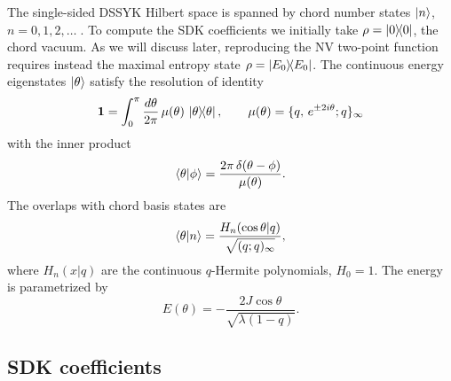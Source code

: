 \documentclass[12pt]{scrarticle}
\begin{document}
The single-sided DSSYK Hilbert space is spanned by chord number states $\ket{n}$,
$n = 0,1,2,\ldots\;$. To compute the SDK coefficients we initially take
$\rho = \ketbra{0}{0}$, the chord vacuum. As we will discuss later,
reproducing the NV two-point function requires instead the maximal entropy state
$\rho = \ketbra{E_0}{E_0}$.
The continuous energy eigenstates $\ket{\theta}$ satisfy the resolution of identity
\begin{equation}
    \mathbf{1} = \int_0^\pi \frac{d\theta}{2\pi}\,\mu(\theta)\,\ketbra{\theta}{\theta},
    \qquad
    \mu(\theta) = \{ q,\,e^{\pm 2i\theta}; q\}_\infty
    \label{eq:resolution}
\end{equation}
with the inner product 
\begin{equation}
    \braket{\theta|\phi} = \frac{2\pi\,\delta(\theta-\phi)}{\mu(\theta)}.
    \label{eq:inner_product}
\end{equation}
The overlaps with chord basis states are
\begin{equation}
    \braket{\theta|n} = \frac{H_n(\cos\theta| q)}{\sqrt{(q;q)_\infty}},
    \label{eq:overlap}
\end{equation}
where $H_n(x| q)$ are the continuous $q$-Hermite polynomials, $H_0 = 1$.
The energy is parametrized by
\begin{equation}
    E(\theta) = -\frac{2J\cos\theta}{\sqrt{\lambda(1-q)}}.
    \label{eq:dispersion}
\end{equation}

\subsection{SDK coefficients}
\end{document}
